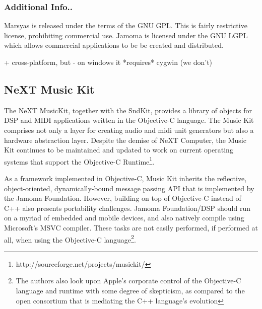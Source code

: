 \documentclass[twoside,10pt]{article}
\begin{document}


\subsubsection{Additional Info..}

Marsyas is released under the terms of the GNU GPL.  This is fairly restrictive license, prohibiting commercial use.  Jamoma is licensed under the GNU LGPL which allows commercial applications to be be created and distributed.

+ cross-platform, but 
- on windows it *requires* cygwin (we don't)

% 


\subsection{NeXT Music Kit} %

The NeXT MusicKit, together with the SndKit, provides a library of objects for DSP and MIDI applications written in the Objective-C language\cite{Jaffe:1989,Jaffe:1991}.  The Music Kit comprises not only a layer for creating audio and midi unit generators but also a hardware abstraction layer.  Despite the demise of NeXT Computer, the Music Kit continues to be maintained and updated to work on current operating systems that support the Objective-C Runtime\footnote{http://sourceforge.net/projects/musickit/}.

As a framework implemented in Objective-C, Music Kit inherits the reflective, object-oriented, dynamically-bound message passing API that is implemented by the Jamoma Foundation.  However, building on top of Objective-C instead of C++ also presents portability challenges.  Jamoma Foundation/DSP should run on a myriad of embedded and mobile devices, and also natively compile using Microsoft's MSVC compiler.  These tasks are not easily performed, if performed at all, when using the Objective-C language\footnote{The authors also look upon Apple's corporate control of the Objective-C language and runtime with some degree of skepticism, as compared to the open consortium that is mediating the C++ language's evolution}.
\end{document}
